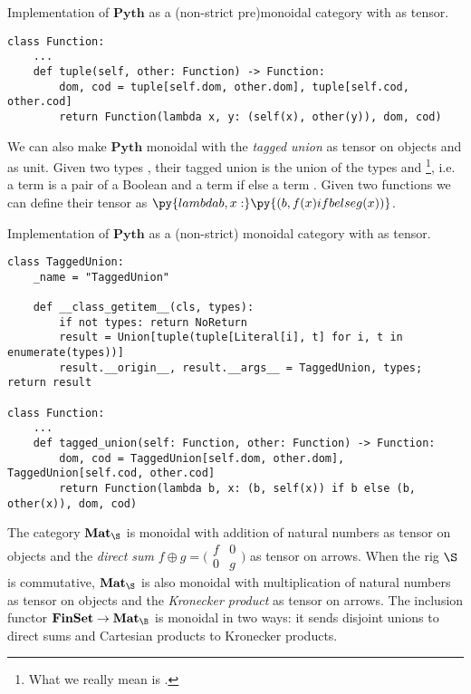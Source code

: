 \begin{python}
{\normalfont Implementation of $\mathbf{Pyth}$ as a (non-strict pre)monoidal category with  as tensor.}

\begin{verbatim}
class Function:
    ...
    def tuple(self, other: Function) -> Function:
        dom, cod = tuple[self.dom, other.dom], tuple[self.cod, other.cod]
        return Function(lambda x, y: (self(x), other(y)), dom, cod)
\end{verbatim}
\end{python}

\begin{example}
We can also make $\mathbf{Pyth}$ monoidal with the \emph{tagged union} as tensor on objects and  as unit.
Given two types , their tagged union  is the union of the types  and \footnote
{What we really mean is .}, i.e. a term  is a pair of a Boolean  and a term  if  else a term .
Given two functions  we can define their tensor as $\py{lambda b, x:} \py{(b, f(x) if b else g(x))}$.
\end{example}

\begin{python}
{\normalfont Implementation of $\mathbf{Pyth}$ as a (non-strict) monoidal category with  as tensor.}

\begin{verbatim}
class TaggedUnion:
    _name = "TaggedUnion"

    def __class_getitem__(cls, types):
        if not types: return NoReturn
        result = Union[tuple(tuple[Literal[i], t] for i, t in enumerate(types))]
        result.__origin__, result.__args__ = TaggedUnion, types; return result

class Function:
    ...
    def tagged_union(self: Function, other: Function) -> Function:
        dom, cod = TaggedUnion[self.dom, other.dom], TaggedUnion[self.cod, other.cod]
        return Function(lambda b, x: (b, self(x)) if b else (b, other(x)), dom, cod)
\end{verbatim}
\end{python}

\begin{example}
The category $\mathbf{Mat}_\S$ is monoidal with addition of natural numbers as tensor on objects and the \emph{direct sum} $f \oplus g = \big(\begin{smallmatrix}f & 0\\ 0 & g\end{smallmatrix}\big)$ as tensor on arrows.
When the rig $\S$ is commutative, $\mathbf{Mat}_\S$ is also monoidal with multiplication of natural numbers as tensor on objects and the \emph{Kronecker product} as tensor on arrows.
The inclusion functor $\mathbf{FinSet} \to \mathbf{Mat}_\B$ is monoidal in two ways: it sends disjoint unions to direct sums and Cartesian products to Kronecker products.
\end{example}

